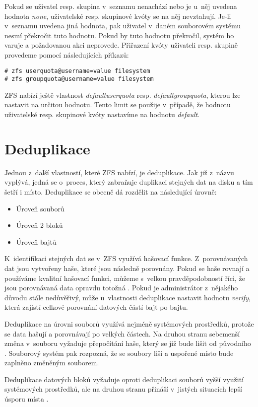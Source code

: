 Pokud se uživatel resp. skupina v~seznamu nenachází nebo je u~něj uvedena hodnota \emph{none}, uživatelské resp. skupinové kvóty se na něj nevztahují. Je-li v~seznamu uvedena jiná hodnota, pak uživatel v~daném souborovém systému nesmí překročit tuto hodnotu. Pokud by tuto hodnotu překročil, systém ho varuje a požadovanou akci neprovede. Přiřazení kvóty uživateli resp. skupině provedeme pomocí následujících příkazů:
\begin{verbatim}
# zfs userquota@username=value filesystem
# zfs groupquota@username=value filesystem
\end{verbatim}

ZFS nabízí ještě vlastnost \emph{defaultuserquota} resp. \emph{defaultgroupquota}, kterou lze nastavit na určitou hodnotu. Tento limit se použije v~případě, že hodnotu uživatelské resp. skupinové kvóty nastavíme na hodnotu \emph{default}.
\section{Deduplikace}
\label{dedup}
Jednou z~další vlastností, které ZFS nabízí, je deduplikace. Jak již z~názvu vyplývá, jedná se o~proces, který zabraňuje duplikaci stejných dat na disku a tím šetří i místo. Deduplikace se obecně dá rozdělit na následující úrovně:
\begin{itemize}
  \item Úroveň souborů
  \item Úroveň 2 bloků
  \item Úroveň bajtů
\end{itemize}

K~identifikaci stejných dat se v~ZFS využívá hašovací funkce. Z~porovnávaných dat jsou vytvořeny haše, které jsou následně porovnány. Pokud se haše rovnají a používáme kvalitní hašovací funkci, můžeme s~velkou pravděpodobností říci, že jsou porovnávaná data opravdu totožná \cite{dedup}. Pokud je administrátor z~nějakého důvodu stále nedůvěřivý, může u~vlastnosti deduplikace nastavit hodnotu \emph{verify}, která zajistí celkové porovnání datových částí bajt po bajtu.

Deduplikace na úrovni souborů využívá nejméně systémových prostředků, protože se data hašují a porovnávají po velkých částech. Na druhou stranu sebemenší změna v~souboru vyžaduje přepočítání haše, který se již bude lišit od původního \cite{dedup}. Souborový systém pak rozpozná, že se soubory liší a uspořené místo bude zaplněno změněným souborem.

Deduplikace datových bloků vyžaduje oproti deduplikaci souborů vyšší využití systémových prostředků, ale na druhou stranu přináší v~jistých situacích lepší úsporu místa \cite{dedup}.

